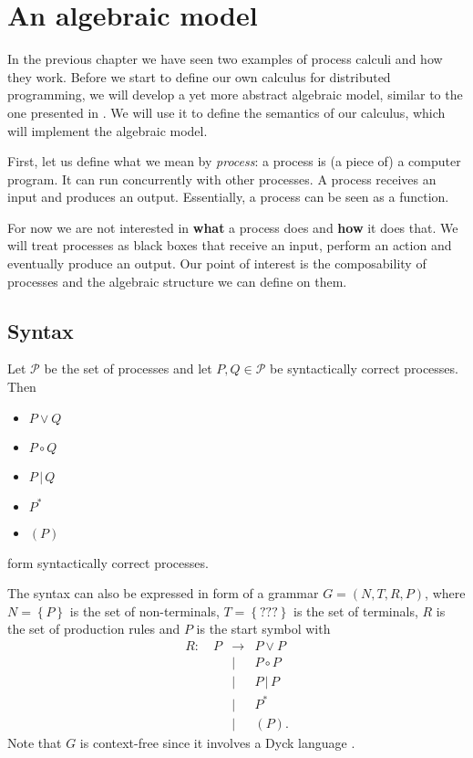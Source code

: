 \chapter{An algebraic model}
In the previous chapter we have seen two examples of process calculi and how they work. Before we start to define our own calculus for distributed programming, we will develop a yet more abstract algebraic model, similar to the one presented in \cite{Hoare:2012:LPU:2368298.2368301}. We will use it to define the semantics of our calculus, which will implement the algebraic model.

First, let us define what we mean by \textit{process}: a process is (a piece of) a computer program. It can run concurrently with other processes. A process receives an input and produces an output. Essentially, a process can be seen as a function. %

For now we are not interested in \textbf{what} a process does and \textbf{how} it does that. We will treat processes as black boxes that receive an input, perform an action and eventually produce an output. Our point of interest is the composability of processes and the algebraic structure we can define on them.

\section{Syntax}

Let $\mathcal{P}$ be the set of processes and let $P, Q \in \mathcal{P}$ be syntactically correct processes. Then
\begin{itemize}
  \item $P \vee Q$
  \vspace*{-0.25em}
  \item $P \circ Q$
  \vspace*{-0.25em}
  \item $P \,|\, Q$
  \vspace*{-0.25em}
  \item $P^*$
  \vspace*{-0.25em}
  \item $\left( P \right)$
\end{itemize}
form syntactically correct processes.

The syntax can also be expressed in form of a grammar $G = \left( N, T, R, P \right)$, where $N = \left\{ P \right\}$ is the set of non-terminals, $T = \left\{ ??? \right\}$ is the set of terminals, $R$ is the set of production rules and $P$ is the start symbol \cite{Hopcroft:2006:IAT:1196416} with %
\begin{eqnarray*}
  R \colon \quad P & \to & P \vee P \\
    & | & P \circ P \\
    & | & P \,|\, P \\
    & | & P^* \\
    & | & \left( P \right).
\end{eqnarray*}
Note that $G$ is context-free since it involves a Dyck language \cite{}.

